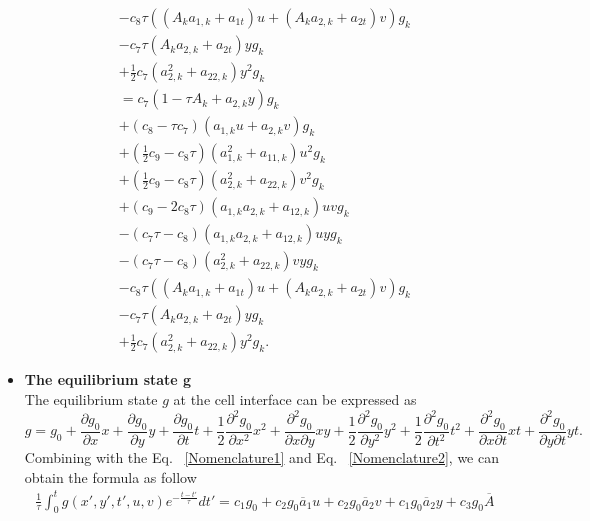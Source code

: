 \documentclass[review]{elsarticle}
\begin{document}
\begin{itemize}
\begin{equation}
\begin{gathered}
			-c_8\tau\left(\left(A_ka_{1,k}+a_{1t}\right)u+\left(A_ka_{2,k}+a_{2t}\right)v\right)g_k\\
		-c_7\tau\left(A_ka_{2,k}+a_{2t}\right)yg_k\\
		+\frac{1}{2}c_7\left(a_{2,k}^2+a_{22,k}\right)y^2g_k\\
		=c_7\left(1-\tau A_k + a_{2,k}y\right)g_k\\
			+\left(c_8-\tau c_7\right)\left(a_{1,k}u+a_{2,k}v\right)g_k\\
			+\left(\frac{1}{2}c_9-c_8\tau\right)\left(a_{1,k}^2+a_{11,k}\right)u^2g_k\\
			+\left(\frac{1}{2}c_9-c_8\tau\right)\left(a_{2,k}^2+a_{22,k}\right)v^2g_k\\
			+\left(c_9-2c_8\tau\right)\left(a_{1,k}a_{2,k}+a_{12,k}\right)uvg_k\\
			-\left(c_7\tau-c_8\right)\left(a_{1,k}a_{2,k}+a_{12,k}\right)uyg_k\\
			-\left(c_7\tau-c_8\right)\left(a_{2,k}^2+a_{22,k}\right)vyg_k\\
			-c_8\tau\left(\left(A_ka_{1,k}+a_{1t}\right)u+\left(A_ka_{2,k}+a_{2t}\right)v\right)g_k\\
			-c_7\tau\left(A_ka_{2,k}+a_{2t}\right)yg_k\\
			+\frac{1}{2}c_7\left(a_{2,k}^2+a_{22,k}\right)y^2g_k.
		\end{gathered}
		\end{equation}
	\item \textbf{The equilibrium state g}\\
	The equilibrium state $g$ at the cell interface can be expressed as
	\begin{equation}
		g=g_0+\frac{\partial g_0}{\partial x}x+\frac{\partial g_0}{\partial y}y+\frac{\partial g_0}{\partial t}t
		+\frac{1}{2}\frac{\partial^2 g_0}{\partial x^2}x^2+\frac{\partial^2 g_0}{\partial x\partial y}xy
		+\frac{1}{2}\frac{\partial^2 g_0}{\partial y^2}y^2+\frac{1}{2}\frac{\partial^2 g_0}{\partial t^2}t^2
		+\frac{\partial^2 g_0}{\partial x\partial t}xt+\frac{\partial^2 g_0}{\partial y\partial t}yt.
	\end{equation}
	Combining with the Eq. ~\eqref{Nomenclature1} and Eq. ~\eqref{Nomenclature2}, we can obtain the formula as follow
	\begin{equation}\label{g}
	\begin{gathered}
		\frac{1}{\tau}\int_{0}^{t}g(x', y', t', u, v)e^{-\frac{t-t'}{\tau}}dt'=c_1g_0+c_2g_0\overline{a}_1u+c_2g_0\overline{a}_2v
		+c_1g_0\overline{a}_2y+c_3g_0\overline{A}\\

\end{gathered}
\end{equation}
\end{itemize}
\end{document}
